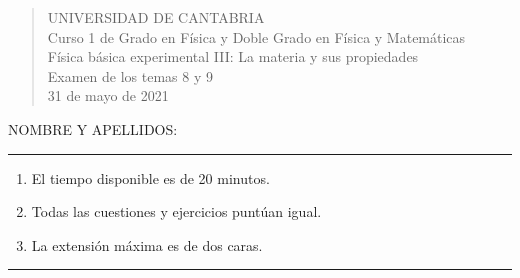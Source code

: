 \documentclass[11pt]{articulo}
\begin{document}
\begin{verse}
{\Large UNIVERSIDAD DE CANTABRIA}\\ 
\vspace*{0.5cm}
{\normalsize \rm Curso 1 de Grado en F\'isica y Doble Grado en F\'isica y Matem\'aticas}\\
{\normalsize \rm F\'isica b\'asica experimental III: La materia y sus propiedades}\\ 
{\normalsize \rm Examen de los temas 8 y 9}\\
{\normalsize \rm 31 de mayo de 2021}\\
\end{verse} 

\vspace*{0.25cm}

NOMBRE Y APELLIDOS:\\

\vspace*{0.25cm}
 
\hrule
\begin{enumerate}
\item[] El tiempo disponible es de 20 minutos.
\item[] Todas las cuestiones y ejercicios punt\'uan igual.
\item[] La extensi\'on m\'axima es de dos caras.
\end{enumerate}
\hrule
          
\end{document}
